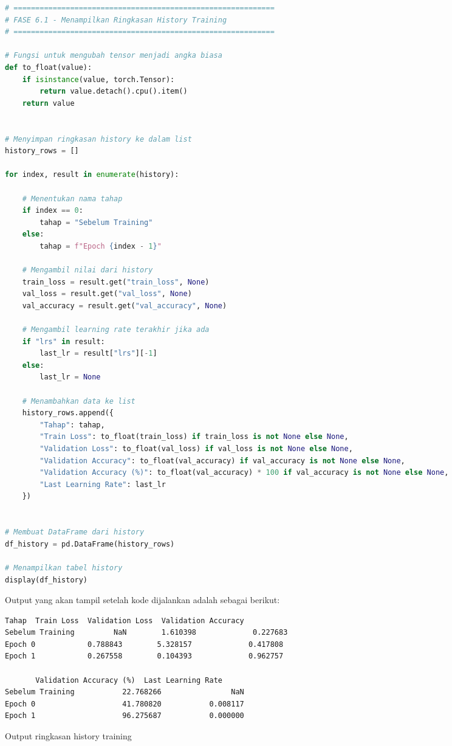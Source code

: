 \begin{lstlisting}[language=Python, caption=Menampilkan ringkasan history training]
# ============================================================
# FASE 6.1 - Menampilkan Ringkasan History Training
# ============================================================

# Fungsi untuk mengubah tensor menjadi angka biasa
def to_float(value):
    if isinstance(value, torch.Tensor):
        return value.detach().cpu().item()
    return value


# Menyimpan ringkasan history ke dalam list
history_rows = []

for index, result in enumerate(history):

    # Menentukan nama tahap
    if index == 0:
        tahap = "Sebelum Training"
    else:
        tahap = f"Epoch {index - 1}"

    # Mengambil nilai dari history
    train_loss = result.get("train_loss", None)
    val_loss = result.get("val_loss", None)
    val_accuracy = result.get("val_accuracy", None)

    # Mengambil learning rate terakhir jika ada
    if "lrs" in result:
        last_lr = result["lrs"][-1]
    else:
        last_lr = None

    # Menambahkan data ke list
    history_rows.append({
        "Tahap": tahap,
        "Train Loss": to_float(train_loss) if train_loss is not None else None,
        "Validation Loss": to_float(val_loss) if val_loss is not None else None,
        "Validation Accuracy": to_float(val_accuracy) if val_accuracy is not None else None,
        "Validation Accuracy (%)": to_float(val_accuracy) * 100 if val_accuracy is not None else None,
        "Last Learning Rate": last_lr
    })


# Membuat DataFrame dari history
df_history = pd.DataFrame(history_rows)

# Menampilkan tabel history
display(df_history)
\end{lstlisting}

Output yang akan tampil setelah kode dijalankan adalah sebagai berikut:

\begin{outputcode}[H]
\begin{lstlisting}[language={}]
       Tahap  Train Loss  Validation Loss  Validation Accuracy
Sebelum Training         NaN        1.610398             0.227683
Epoch 0            0.788843        5.328157             0.417808
Epoch 1            0.267558        0.104393             0.962757

       Validation Accuracy (%)  Last Learning Rate
Sebelum Training           22.768266                NaN
Epoch 0                    41.780820           0.008117
Epoch 1                    96.275687           0.000000
\end{lstlisting}
\caption{Output ringkasan history training}
\end{outputcode}

